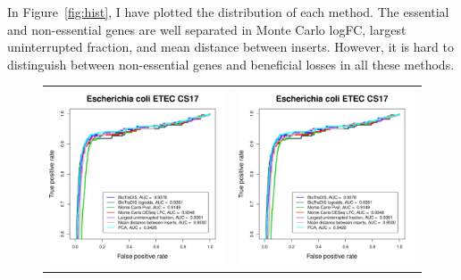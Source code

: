 \documentclass[12pt,letterpaper]{article}
\begin{document}
In Figure~\ref{fig:hist}, I have plotted the distribution of each method. The essential and non-essential genes are well separated in Monte Carlo logFC, largest uninterrupted fraction, and mean distance between inserts. However, it is hard to distinguish between non-essential genes and beneficial losses in all these methods.

\begin{figure}
\centering
\begin{tabular}{c c}
\includegraphics[page=4, scale=0.5]{essential-call-comparison-CS17.pdf} &
\includegraphics[page=5, scale=0.5]{essential-call-comparison-CS17.pdf} \\

\end{tabular}
\end{figure}
\end{document}
